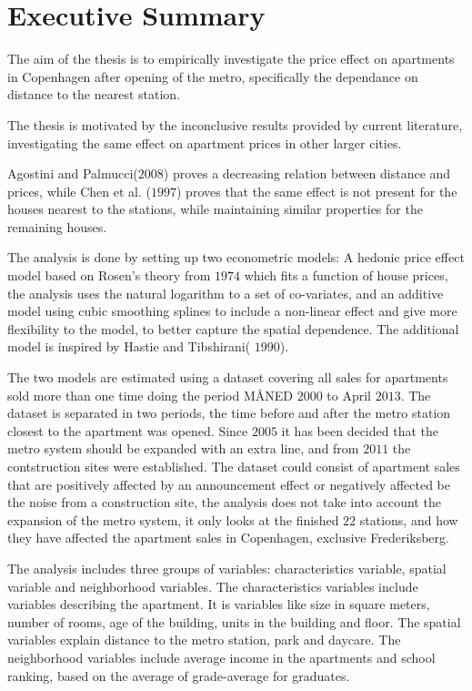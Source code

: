 \section{Executive Summary}
The aim of the thesis is to empirically investigate the price effect on 
apartments in Copenhagen after opening of the metro, specifically the dependance
on distance to the nearest station.

The thesis is motivated by the inconclusive results provided by current 
literature, investigating the same effect on apartment prices in other larger 
cities. 

Agostini and Palmucci($2008$) proves a decreasing relation between 
distance and prices, while Chen et al. ($1997$) proves that the same effect is 
not present for the houses nearest to the stations, while maintaining similar 
properties for the remaining houses.

The analysis is done by setting up two econometric models:  A 
hedonic price effect model based on Rosen's theory from $1974$ which fits a 
function of house prices, the analysis uses the natural logarithm to a 
set of co-variates,  and an additive model using cubic smoothing splines to 
include a non-linear effect and give more flexibility to the model, to better 
capture the spatial dependence. The additional model is inspired by Hastie and 
Tibshirani( $1990$). 

The two models are estimated using a dataset covering all sales for 
apartments sold more than one time doing the period MÅNED $2000$ to April $
2013$. The 
dataset is separated in two periods, the time before and after the metro 
station closest to the apartment was opened. Since $2005$ it has been decided 
that the metro system should be expanded with an extra line, and from $2011$ 
the contstruction sites were established. The dataset could consist of 
apartment 
sales that are positively affected by an announcement effect or negatively 
affected 
be the noise from a construction site, the analysis does not take into account 
the expansion of the metro system, it only looks at  the finished $22$ 
stations, and how they have affected the apartment sales in Copenhagen, 
exclusive Frederiksberg. %

The analysis includes three groups of variables: characteristics variable, 
spatial variable and neighborhood variables. The characteristics variables 
include variables describing the apartment. It is variables like size in 
square 
meters, number of rooms, age of the building, units in the building and 
floor. The spatial variables explain distance to the metro station, park and 
daycare. The neighborhood variables include average income in the apartments 
and school ranking, based on the average of grade-average for graduates. 

